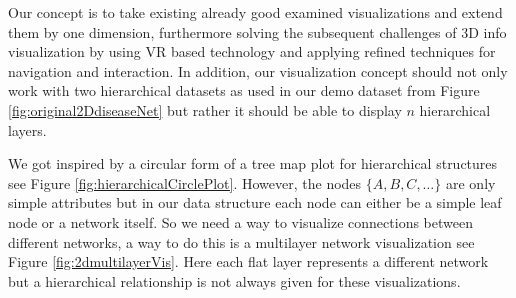 Our concept is to take existing already good examined visualizations and extend them by one dimension, furthermore solving the subsequent challenges of 3D info visualization by using VR based technology and applying refined techniques for navigation and interaction. 
In addition, our visualization concept should not only work with two hierarchical datasets as used in our demo dataset from Figure \ref{fig:original2DdiseaseNet} but rather it should be able to display $n$ hierarchical layers.

We got inspired by a circular form of a tree map plot for hierarchical structures see Figure \ref{fig:hierarchicalCirclePlot}. However, the nodes $\{A,B,C,\dots\}$ are only simple attributes but in our data structure each node can either be a simple leaf node or a network itself. So we need a way to visualize connections between different networks, a way to do this is a multilayer network visualization see Figure \ref{fig:2dmultilayerVis}. Here each flat layer represents a different network but a hierarchical relationship is not always given for these visualizations.  

